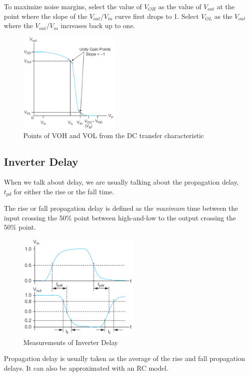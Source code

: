 \documentclass{article}
\begin{document}
To maximize noise margins, select the value of $V_{OH}$ as the value of $V_{out}$ at the point where the slope of the $V_{out}/V_{in}$ curve first drops to 1. Select $V_{OL}$ as the $V_{out}$ where the $V_{out}/V_{in}$ increases back up to one. 

\begin{figure}[ht!]
\centering
\includegraphics[width=50mm]{NoiseMargin.png}
\caption{Points of VOH and VOL from the DC transfer characteristic}
\end{figure}

\subsection{Inverter Delay}

When we talk about delay, we are usually talking about the propagation delay, $t_{pd}$ for either the rise or the fall time. 

The rise or fall propagation delay is defined as the \textit{maximum} time between the input crossing the 50\% point between high-and-low to the output crossing the 50\% point.

\begin{figure}[ht!]
\centering
\includegraphics[width=60mm]{Delay.png}
\caption{Measurements of Inverter Delay}
\end{figure}

Propagation delay is usually taken as the average of the rise and fall propagation delays. It can also be approximated with an RC model.
\end{document}
